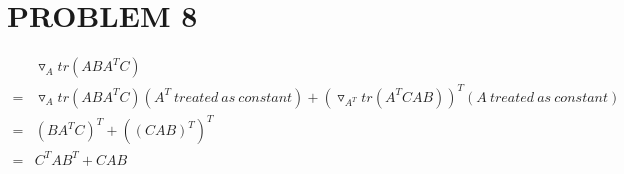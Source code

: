 \documentclass{article}
\begin{document}
	\section{PROBLEM 8}
		\begin{equation*}
			\begin{aligned}
				 & \triangledown_A tr(ABA^TC)\\
				=& \triangledown_A tr(ABA^TC) (A^T\ treated\ as\ constant) + (\triangledown_{A^T} tr(A^TCAB))^T (A\ treated\ as\ constant)\\
				=& (BA^TC)^T + ((CAB)^T)^T\\
				=& C^TAB^T + CAB
			\end{aligned}
		\end{equation*}
\end{document}
